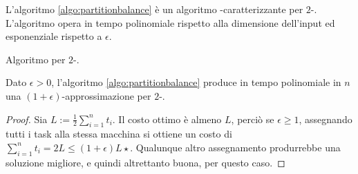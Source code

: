 L'algoritmo \ref{algo:partitionbalance} è un algoritmo \PTAS-caratterizzante per $2$-\LoadBalancing.
L'algoritmo opera in tempo polinomiale rispetto alla dimensione dell'input ed esponenziale rispetto a $\epsilon$.

\begin{algorithm}
	\caption{Algoritmo \PTAS per $2$-\LoadBalancing.}
	\label{algo:partitionbalance}
	
\end{algorithm}

\begin{theorem}
	Dato $\epsilon>0$, l'algoritmo \ref{algo:partitionbalance} produce in tempo polinomiale in $n$ una $(1+\epsilon)$-approssimazione per $2$-\LoadBalancing.
\end{theorem}
\begin{proof}
	Sia $L:=\frac12\sum_{i=1}^n t_i$.
	Il costo ottimo è almeno $L$, perciò se $\epsilon\geq1$, assegnando tutti i task alla stessa macchina si ottiene un costo di $\sum_{i=1}^n t_i=2L\leq(1+\epsilon)L\star$. Qualunque altro assegnamento produrrebbe una soluzione migliore, e quindi altrettanto buona, per questo caso.


\end{proof}
